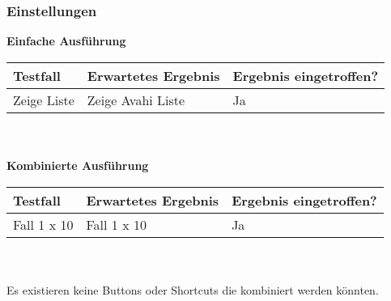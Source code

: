 \subsubsection{Einstellungen}
\textbf{Einfache Ausführung}
\\
\begin{tabularx}{\textwidth}{|X|X|l|}
    \hline
    \textbf{Testfall} & \textbf{Erwartetes Ergebnis} & \textbf{Ergebnis eingetroffen?}\\
    \hline
    Zeige Liste & Zeige Avahi Liste & Ja\\
    \hline
\end{tabularx}
\\
\\
\textbf{Kombinierte Ausführung}
\\
\begin{tabularx}{\textwidth}{|X|X|l|}
    \hline
    \textbf{Testfall} & \textbf{Erwartetes Ergebnis} & \textbf{Ergebnis eingetroffen?}\\
    \hline
    Fall 1 x 10 & Fall 1 x 10 & Ja\\
    \hline
\end{tabularx}
\\
\\
Es existieren keine Buttons oder Shortcuts die kombiniert werden könnten. 
